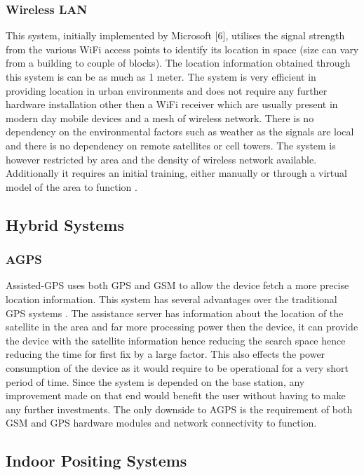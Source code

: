 \documentclass[12pt]{report}
\begin{document}
\subsubsection{Wireless LAN}
This system, initially implemented by Microsoft [6], utilises the signal strength from the various WiFi access points to identify its location in space (size can vary from a building to couple of blocks). The location information obtained through this system is can be as much as 1 meter. The system is very efficient in providing location in urban environments and does not require any further hardware installation other then a WiFi receiver which are usually present in modern day mobile devices and a mesh of wireless network. There is no dependency on the environmental factors such as weather as the signals are local and there is no dependency on remote satellites or cell towers. The system is however restricted by area and the density of wireless network available. Additionally it requires an initial training, either manually or through a virtual model of the area to function \cite{schiller2004location}.

\subsection{Hybrid Systems}

\subsubsection{AGPS}
Assisted-GPS uses both GPS and GSM to allow the device fetch a more precise location information. This system has several advantages over the traditional GPS systems \cite{djuknic2001geolocation}. The assistance server has information about the location of the satellite in the area and far more processing power then the device, it can provide the device with the satellite information hence reducing the search space hence reducing the time for first fix by a large factor. This also effects the power consumption of the device as it would require to be operational for a very short period of time. Since the system is depended on the base station, any improvement made on that end would benefit the user without having to make any further investments. The only downside to AGPS is the requirement of both GSM and GPS hardware modules and network connectivity to function.

\subsection{Indoor Positing Systems}
\end{document}
